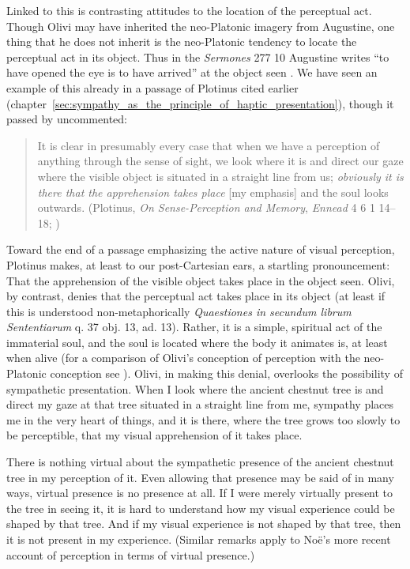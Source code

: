 Linked to this is contrasting attitudes to the location of the perceptual act. Though Olivi may have inherited the neo-Platonic imagery from Augustine, one thing that he does not inherit is the neo-Platonic tendency to locate the perceptual act in its object. Thus in the \emph{Sermones} 277 10 Augustine writes ``to have opened the eye is to have arrived'' at the object seen \citep[82]{ODaly:1987fq}. We have seen an example of this already in a passage of Plotinus cited earlier  (chapter~\ref{sec:sympathy_as_the_principle_of_haptic_presentation}), though it passed by uncommented: 
\begin{quote}
	It is clear in presumably every case that when we have a perception of anything through the sense of sight, we look where it is and direct our gaze where the visible object is situated in a straight line from us; \emph{obviously it is there that the apprehension takes place} [my emphasis] and the soul looks outwards. (Plotinus, \emph{On Sense-Perception and Memory}, \emph{Ennead} 4 6 1 14--18; \citealt[321]{Armstrong:1984aa})
\end{quote}
Toward the end of a passage emphasizing the active nature of visual perception, Plotinus makes, at least to our post-Cartesian ears, a startling pronouncement: That the apprehension of the visible object takes place in the object seen. Olivi, by contrast, denies that the perceptual act takes place in its object (at least if this is understood non-metaphorically \emph{Quaestiones in secundum librum Sententiarum} q. 37 obj. 13, ad. 13). Rather, it is a simple, spiritual act of the immaterial soul, and the soul is located where the body it animates is, at least when alive (for a comparison of Olivi's conception of perception with the neo-Platonic conception see \citealt[151]{Toivanen:2013ul}). Olivi, in making this denial, overlooks the possibility of sympathetic presentation. When I look where the ancient chestnut tree is and direct my gaze at that tree situated in a straight line from me, sympathy places me in the very heart of things, and it is there, where the tree grows too slowly to be perceptible, that my visual apprehension of it takes place.

There is nothing virtual about the sympathetic presence of the ancient chestnut tree in my perception of it. Even allowing that presence may be said of in many ways, virtual presence is no presence at all. If I were merely virtually present to the tree in seeing it, it is hard to understand how my visual experience could be shaped by that tree. And if my visual experience is not shaped by that tree, then it is not present in my experience. (Similar remarks apply to Noë's \citeyear{Noe:2012aa} more recent account of perception in terms of virtual presence.)

